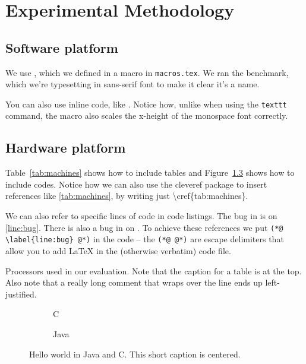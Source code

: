 \chapter{Experimental Methodology}
\label{cha:methodology}

\section{Software platform}
\label{sec:softplat}

We use \jikesrvm, which we defined in a macro in \texttt{macros.tex}. We ran the
\avrora benchmark, which we're typesetting in sans-serif font to make it clear
it's a name.

You can also use inline code, like . Notice how, unlike when
using the \texttt{texttt} command, the  macro also scales the
x-height of the monospace font correctly.

\section{Hardware platform}
\label{sec:hardplat}

Table~\ref{tab:machines} shows how to include tables and 
Figure~\ref{fig:helloworld} shows how to include codes. Notice how we can also 
use the \textsf{cleveref} package to insert references like \cref{tab:machines},
by writing just \textbackslash cref\{tab:machines\}.

We can also refer to specific lines of code in code listings. The bug in
 is on \cref{line:bug}. There is also a bug in
 on . To
achieve these references we put
\texttt{(*@ \textbackslash label\{line:bug\} @*)}
in the code -- the \texttt{(*@ @*)} are escape delimiters that allow you to add
LaTeX in the (otherwise verbatim) code file.

\begin{table*}
  \centering
  \caption{Processors used in our evaluation.  Note that the caption for a table is at the top.  Also note that a really long comment that wraps over the line ends up left-justified.}
  \label{tab:machines}
  
\end{table*}

\begin{figure}
  \centering
  \begin{subfigure}[b]{\textwidth}
      
      \caption{C}
      \label{fig:c:hello}
  \end{subfigure}

  \begin{subfigure}[b]{\textwidth}
      
      \caption{Java}
      \label{fig:java:hello}
  \end{subfigure}

  \caption{Hello world in Java and C. This short caption is centered.}
  \label{fig:helloworld}
\end{figure}



